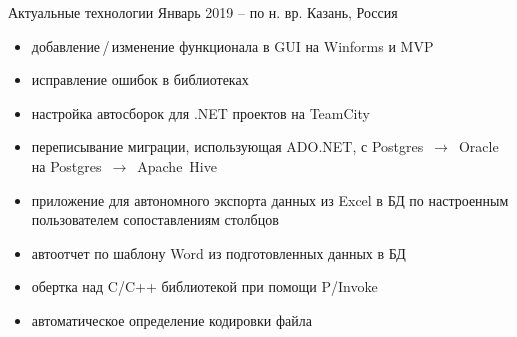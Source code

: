 \documentclass[10pt,a4paper,ragged2e,withhyper]{altacv}
\begin{document}

\makecvheader



\begin{paracol}{2}



{Актуальные технологии}
{Январь 2019 -- по н. вр.}
{Казань, Россия}

\begin{itemize}

\item добавление\,/\,изменение функционала в GUI на Winforms и MVP
\smallskip

\item исправление ошибок в библиотеках
\smallskip

\item настройка автосборок для .NET проектов на TeamCity
\smallskip

\item переписывание миграции, использующая ADO.NET,
\newline с Postgres~$\rightarrow$~Oracle на Postgres~$\rightarrow$~Apache~Hive
\smallskip

\item приложение для автономного экспорта данных из Excel в БД по настроенным пользователем сопоставлениям столбцов
\smallskip

\item автоотчет по шаблону Word из подготовленных данных в БД
\smallskip

\item обертка над C/C++ библиотекой при помощи P/Invoke
\smallskip

\item автоматическое определение кодировки файла

\end{itemize}

\divider


\end{paracol}
\end{document}
